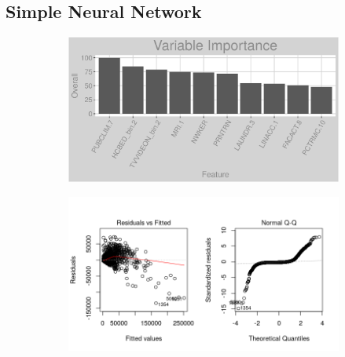 \subsection{Simple Neural Network}
\label{appendix:electricity:snn}
\begin{figure}[h]
\centering
\begin{subfigure}{1\textwidth}
\centering
\includegraphics[width=.99\textwidth, height=0.3\textheight]{Images/electricity_nn_vars.png}
\end{subfigure}
\begin{subfigure}{1\textwidth}
\centering
\includegraphics[width=.99\textwidth, height=0.475\textheight]{Images/electricity_nn_res_1.png}
\end{subfigure}
\end{figure}
\FloatBarrier
\newpage
